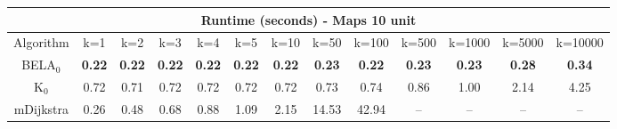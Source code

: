 \begin{tabular}{c|cccccccccccc}\toprule
\multicolumn{13}{c}{Runtime (seconds) - Maps 10 unit}\\ \midrule
Algorithm & k=1 & k=2 & k=3 & k=4 & k=5 & k=10 & k=50 & k=100 & k=500 & k=1000 & k=5000 & k=10000 \\ \midrule
BELA$_0$ & \textbf{0.22} & \textbf{0.22} & \textbf{0.22} & \textbf{0.22} & \textbf{0.22} & \textbf{0.22} & \textbf{0.23} & \textbf{0.22} & \textbf{0.23} & \textbf{0.23} & \textbf{0.28} & \textbf{0.34} \\
K$_0$ & 0.72 & 0.71 & 0.72 & 0.72 & 0.72 & 0.72 & 0.73 & 0.74 & 0.86 & 1.00 & 2.14 & 4.25 \\
mDijkstra & 0.26 & 0.48 & 0.68 & 0.88 & 1.09 & 2.15 & 14.53 & 42.94 & -- & -- & -- & -- \\ \bottomrule 
\end{tabular}
